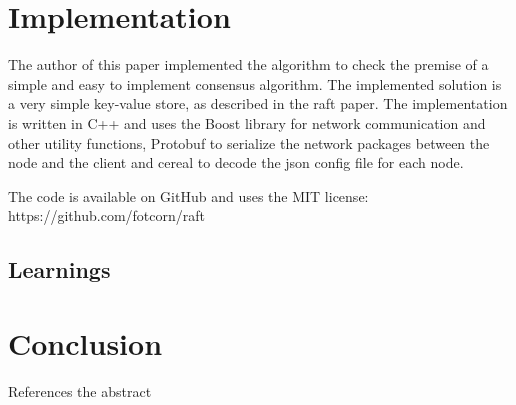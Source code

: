 \section {Implementation}

The author of this paper implemented the algorithm to check the premise of a simple and easy to implement consensus algorithm. The implemented solution is a very simple key-value store, as described in the raft paper. The implementation is written in C++ and uses the Boost library for network communication and other utility functions, Protobuf to serialize the network packages between the node and the client and cereal to decode the json config file for each node.

The code is available on GitHub and uses the MIT license: https://github.com/fotcorn/raft

\subsection{Learnings}

\section{Conclusion}
References the abstract


